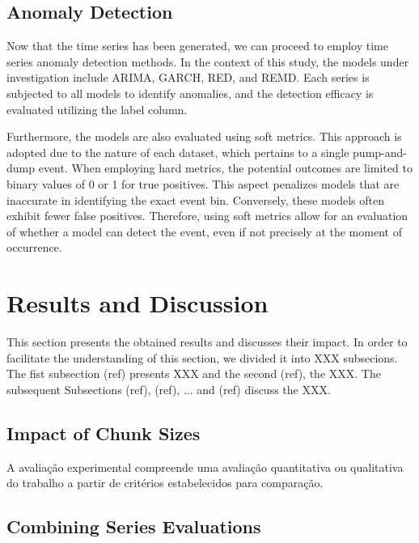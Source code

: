 \documentclass[12pt]{article}
\begin{document}
    \subsection{Anomaly Detection}
	\label{subsec_met_anomaly_detection}

    Now that the time series has been generated, we can proceed to employ time series anomaly detection methods.
    In the context of this study, the models under investigation include ARIMA, GARCH, RED, and REMD.
    Each series is subjected to all models to identify anomalies, and the detection efficacy is evaluated utilizing the label column.

    Furthermore, the models are also evaluated using soft metrics.
    This approach is adopted due to the nature of each dataset, which pertains to a single pump-and-dump event.
    When employing hard metrics, the potential outcomes are limited to binary values of 0 or 1 for true positives.
    This aspect penalizes models that are inaccurate in identifying the exact event bin.
    Conversely, these models often exhibit fewer false positives.
    Therefore, using soft metrics allow for an evaluation of whether a model can detect the event, even if not precisely at the moment of occurrence.
	
	\section{Results and Discussion}
	\label{sec_aval_exp}

	This section presents the obtained results and discusses their impact.
	In order to facilitate the understanding of this section, we divided it into XXX subsecions.
	The fist subsection (ref) presents XXX and the second (ref), the XXX.
	The subsequent Subsections (ref), (ref), ... and (ref) discuss the XXX.

	\subsection{Impact of Chunk Sizes}
	\label{subsec_result_time_interval}
	
	A avaliação experimental compreende uma avaliação quantitativa ou qualitativa do trabalho a partir de critérios estabelecidos para comparação.

	\subsection{Combining Series Evaluations}
	\label{subsec_result_series_evals}
\end{document}

